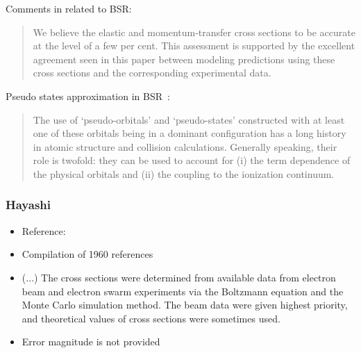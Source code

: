 Comments in \cite{Pitchford2013} related to BSR:
\blockquote{
We believe the elastic and momentum-transfer cross
sections to be accurate at the level of a few per cent. This
assessment is supported by the excellent agreement seen
in this paper between modeling predictions using these
cross sections and the corresponding experimental data.
}

Pseudo states approximation in BSR~\cite{Zatsarinny2013}:
\blockquote{
The use of `pseudo-orbitals' and `pseudo-states' constructed
with at least one of these orbitals being in a dominant
configuration has a long history in atomic structure and
collision calculations. Generally speaking, their role is
twofold: they can be used to account for (i) the term
dependence of the physical orbitals and (ii) the coupling to
the ionization continuum.
}

\subsubsection{Hayashi}
\begin{itemize}
\item Reference: \cite{Pitchford2013,Pitchford2017,Hayashi2003}
\item Compilation of 1960 references
\item ($\ldots$) The cross sections were determined from available data from electron beam and
electron swarm experiments via the Boltzmann equation and
the Monte Carlo simulation method. The beam data were given
highest priority, and theoretical values of cross sections were
sometimes used.
\item Error magnitude is not provided
\end{itemize}

